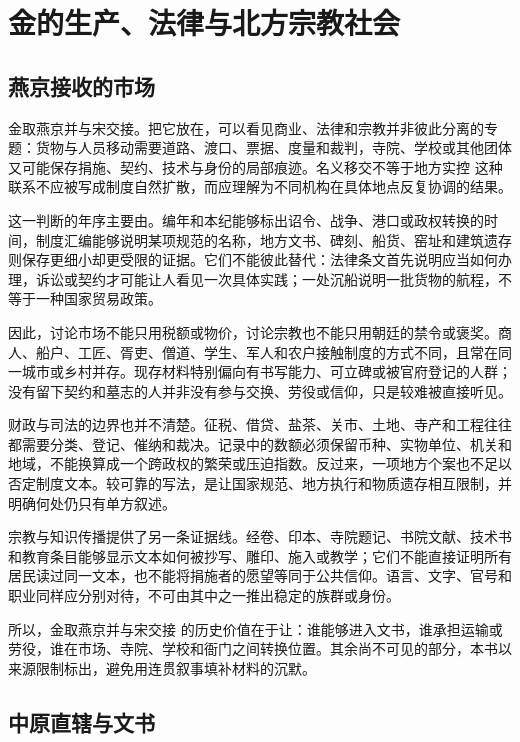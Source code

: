 \section{金的生产、法律与北方宗教社会}

\subsection{燕京接收的市场}

金取燕京并与宋交接。把它放在，可以看见商业、法律和宗教并非彼此分离的专题：货物与人员移动需要道路、渡口、票据、度量和裁判，寺院、学校或其他团体又可能保存捐施、契约、技术与身份的局部痕迹。名义移交不等于地方实控 这种联系不应被写成制度自然扩散，而应理解为不同机构在具体地点反复协调的结果。

这一判断的年序主要由。编年和本纪能够标出诏令、战争、港口或政权转换的时间，制度汇编能够说明某项规范的名称，地方文书、碑刻、船货、窑址和建筑遗存则保存更细小却更受限的证据。它们不能彼此替代：法律条文首先说明应当如何办理，诉讼或契约才可能让人看见一次具体实践；一处沉船说明一批货物的航程，不等于一种国家贸易政策。

因此，讨论市场不能只用税额或物价，讨论宗教也不能只用朝廷的禁令或褒奖。商人、船户、工匠、胥吏、僧道、学生、军人和农户接触制度的方式不同，且常在同一城市或乡村并存。现存材料特别偏向有书写能力、可立碑或被官府登记的人群；没有留下契约和墓志的人并非没有参与交换、劳役或信仰，只是较难被直接听见。

财政与司法的边界也并不清楚。征税、借贷、盐茶、关市、土地、寺产和工程往往都需要分类、登记、催纳和裁决。记录中的数额必须保留币种、实物单位、机关和地域，不能换算成一个跨政权的繁荣或压迫指数。反过来，一项地方个案也不足以否定制度文本。较可靠的写法，是让国家规范、地方执行和物质遗存相互限制，并明确何处仍只有单方叙述。

宗教与知识传播提供了另一条证据线。经卷、印本、寺院题记、书院文献、技术书和教育条目能够显示文本如何被抄写、雕印、施入或教学；它们不能直接证明所有居民读过同一文本，也不能将捐施者的愿望等同于公共信仰。语言、文字、官号和职业同样应分别对待，不可由其中之一推出稳定的族群或身份。

所以，金取燕京并与宋交接 的历史价值在于让：谁能够进入文书，谁承担运输或劳役，谁在市场、寺院、学校和衙门之间转换位置。其余尚不可见的部分，本书以来源限制标出，避免用连贯叙事填补材料的沉默。

\subsection{中原直辖与文书}

